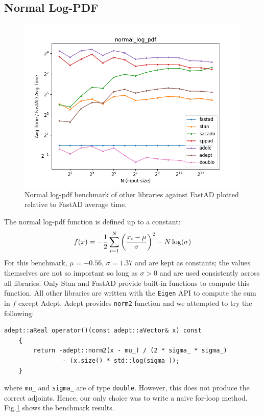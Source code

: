 \subsection{Normal Log-PDF}

\begin{figure}[t]
    \centering
    \includegraphics[width=\textwidth]{figs/normal_log_pdf_fig.png}
    \caption{%
        Normal log-pdf benchmark of other libraries against FastAD 
        plotted relative to FastAD average time.
    }\label{fig:normal_log_pdf}
\end{figure}

The normal log-pdf function is defined up to a constant:
\[
    f(x) = -\frac{1}{2} \sum\limits_{i=1}^N \left(\frac{x_i - \mu}{\sigma}\right)^2 
           -N\log(\sigma)
\]
For this benchmark, $\mu = -0.56,\,\sigma = 1.37$ and are kept as constants;
the values themselves are not so important so long as $\sigma > 0$
and are used consistently across all libraries.
Only Stan and FastAD provide built-in functions to compute this function.
All other libraries are written with the \verb|Eigen| API to compute the sum in $f$ except Adept.
Adept provides \verb|norm2| function and we attempted to try the following:
\begin{lstlisting}[style=customcpp]
    adept::aReal operator()(const adept::aVector& x) const
    {
        return -adept::norm2(x - mu_) / (2 * sigma_ * sigma_) 
                - (x.size() * std::log(sigma_));
    }
\end{lstlisting}
where \verb|mu_| and \verb|sigma_| are of type \verb|double|.
However, this does not produce the correct adjoints.
Hence, our only choice was to write a naive for-loop method.
Fig.\ref{fig:normal_log_pdf} shows the benchmark results.

